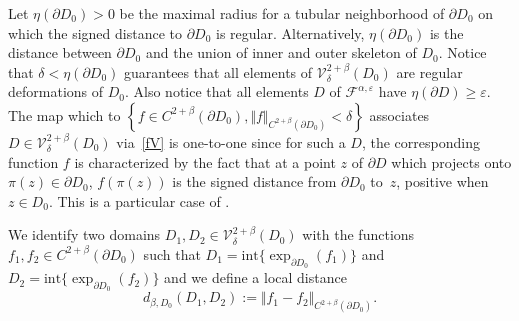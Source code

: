 \documentclass[10pt]{amsart}
\theoremstyle{plain}
\theoremstyle{definition}
\newcommand{\inte}{\mathrm{int}}
\let\di\displaystyle
\let\b\beta
\let\d\delta
\let\e\varepsilon
\newcommand{\cF}{\mathcal{F}}
\begin{document}
Let $\eta(\partial D_0)>0$ be the maximal radius for a tubular neighborhood of $\partial D_0$ on which the signed distance to $\partial D_0$ is regular. Alternatively, $\eta(\partial D_0)$ is the distance between $\partial D_0$ and the union of inner and outer skeleton of $D_0$.
Notice that $\d < \eta(\partial D_0)$
guarantees that
all elements of $\mathcal{V}_\d^{2+\b}(D_0)$ are regular deformations of $D_0$. Also notice that all elements $D$ of $\cF^{\alpha,\e}$ have $\eta(\partial D)\ge \e$. The map which to $\di \left\{f \in C^{2+ \b} (\partial D_0), \Vert f \Vert_{C^{2 +\b}(\partial D_0)} < \d \right\}$ associates $D\in \mathcal{V}_\d^{2+\b}(D_0)$ via~\eqref{fV} is one-to-one since for such a $D$,
the corresponding function $f$ is characterized by the fact that at a point $z$ of $\partial D$ which projects onto $\pi(z)\in \partial D_0$, $f(\pi(z))$ is the signed distance from $\partial D_0$ to~$z$, positive when $z\in D_0$. This is a particular case of \cite[Th.\,1.5]{CMM91}.

We identify two domains $ D_1, D_2 \!\in\! \mathcal{V}_\d^{2+\b}(D_0) $ with the functions $ f_1, f_2 \!\in\! C^{2+ \b} (\partial D_0) $ such that
$ D_1 = \inte \{\exp_{\partial D_0} (f_1)\}$ and $ D_2 = \inte \{\exp_{\partial D_0} (f_2)\}$ and we define a local distance
\begin{equation}\label{dD}
d_{\b,D_0}(D_1,D_2):= \Vert f_1 -f_2 \Vert_{C^{2+\b}(\partial D_0)}.
\end{equation}
\end{document}
